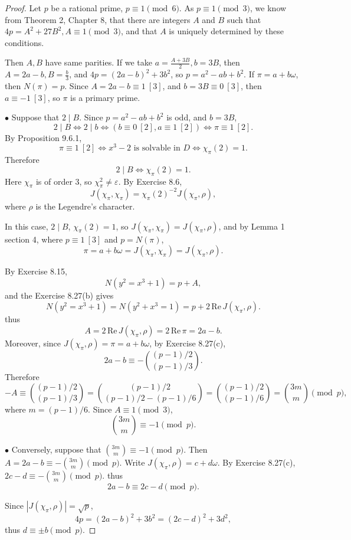 \documentclass[11pt,a4paper]{article}
\newcommand{\re}{\,\mathrm{Re}\,}
\begin{document}
\begin{proof}
Let $p$ be a rational prime, $p\equiv 1 \pmod 6$. As $p\equiv 1 \pmod 3$, we know from Theorem 2, Chapter 8, that there are integers $A$ and $B$ such that $4p = A^2 + 27B^2, A\equiv 1 \pmod 3$, and that $A$ is uniquely determined by these conditions.

Then $A,B$ have same parities. If we take $a =\frac{A+3B}{2}, b = 3B$, then $A = 2a -b, B = \frac{b}{3}$, and $4p = (2a-b)^2 + 3 b^2$, so $p = a^2 -ab + b^2$. If $\pi = a + b \omega$, then $N(\pi)= p$. Since $A = 2a-b \equiv 1 \ [3]$, and $b = 3B \equiv 0 \ [3]$, then $a \equiv -1 \ [3]$, so $\pi$ is a primary prime.

\bigskip

$\bullet$ Suppose that $2\mid B$.
Since $p =a^2 -ab +b^2$ is odd, and $b = 3B$,
$$2 \mid B \iff 2 \mid b \iff (b \equiv 0 \  [2], a\equiv 1\ [2]) \iff \pi \equiv 1 \ [2].$$
By Proposition 9.6.1, 
 $$\pi \equiv 1 \ [2] \iff x^3-2 \text{ is solvable in } D \iff  \chi_\pi(2) = 1.$$
 Therefore
 $$2 \mid B \iff \chi_\pi(2) = 1.$$
 Here $\chi_\pi$ is of order 3, so $\chi_\pi^2 \ne \varepsilon$. By Exercise 8.6,
$$J(\chi_\pi,\chi_\pi) = \chi_\pi(2)^{-2} J(\chi_\pi,\rho),$$
where $\rho $ is the Legendre's character.

In this case, $2 \mid B$, $\chi_\pi(2) = 1$, so $J(\chi_\pi,\chi_\pi) =  J(\chi_\pi,\rho)$, and by Lemma 1 section 4, where $p\equiv 1 \ [3]$ and $p = N(\pi)$, $$\pi = a + b \omega = J(\chi_\pi,\chi_\pi) = J(\chi_\pi,\rho).$$

By Exercise 8.15, $$N(y^2 = x^3+1) = p+A,$$ and the Exercise 8.27(b) gives
$$N(y^2 = x^3 + 1) = N(y^2 +x^3 = 1) = p+ 2 \re J(\chi_\pi,\rho).$$
thus
$$A = 2 \re J(\chi_\pi,\rho) = 2 \re \pi = 2a -b.$$
Moreover, since $J(\chi_\pi,\rho) = \pi = a + b \omega$, by Exercise 8.27(c),
$$2a-b \equiv -\binom{(p-1)/2}{(p-1)/3}.$$
Therefore
$$-A \equiv \binom{(p-1)/2}{(p-1)/3} =\binom{(p-1)/2}{(p-1)/2 - (p-1)/6}  =  \binom{(p-1)/2}{(p-1)/6}=\binom{3m}{m} \pmod p,$$
where $m=(p-1)/6.$
Since $A\equiv 1 \pmod 3$,
$$\binom{3m}{m} \equiv -1 \pmod p.$$

\bigskip

$\bullet$ Conversely, suppose that $\binom{3m}{m} \equiv -1 \pmod p$. Then $A = 2a -b \equiv  -\binom{3m}{m} \pmod p$.
Write $J(\chi_\pi,\rho) = c + d\omega$. By Exercise 8.27(c), $2c - d \equiv -\binom{3m}{m} \pmod p$. thus
$$2a -b \equiv 2c - d \pmod p.$$

Since $|J(\chi_\pi,\rho)| = \sqrt{p}$, 
$$4p = (2a-b)^2 + 3b^2 = (2c-d)^2 + 3d^2,$$
thus $d \equiv \pm b \pmod p$.


\end{proof}
\end{document}
